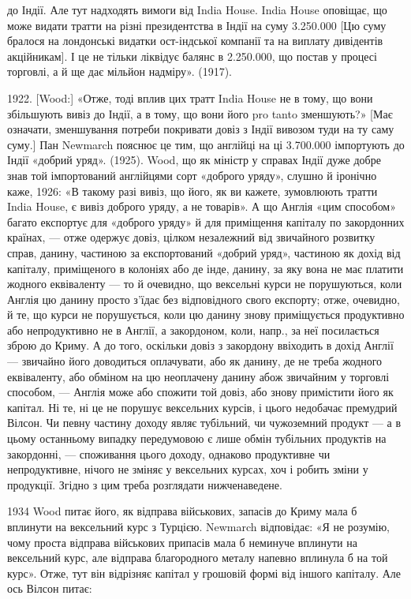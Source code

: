 \parcont{}  %
до Індії. Але тут надходять вимоги від India House. India House оповіщає, що
може видати тратти на різні президентства в Індії на суму \num{3.250.000}
[Цю суму бралося на лондонські видатки ост-індської компанії та на виплату
дивідентів акційникам]. І це не тільки ліквідує балянс в \num{2.250.000}, що
постав у процесі торговлі, а й ще дає мільйон надміру». (1917).

1922. [Wood:] «Отже, тоді вплив цих тратт India House не в тому, що
вони збільшують вивіз до Індії, а в тому, що вони його pro tanto зменшують?»
[Має означати, зменшування потреби покривати довіз з Індії вивозом туди на ту
саму суму.] Пан Newmarch пояснює це тим, що англійці на ці \num{3.700.000}
імпортують до Індії «добрий уряд». (1925). Wood, що як міністр у справах Індії дуже
добре знав той імпортований англійцями сорт «доброго уряду», слушно й іронічно
каже, 1926: «В такому разі вивіз, що його, як ви кажете, зумовлюють
тратти India House, є вивіз доброго уряду, а не товарів». А що Англія
«цим способом» багато експортує для «доброго уряду» й для приміщення
капіталу по закордонних країнах, — отже одержує довіз, цілком незалежний від
звичайного розвитку справ, данину, частиною за експортований «добрий уряд»,
частиною як дохід від капіталу, приміщеного в колоніях або де інде, данину,
за яку вона не має платити жодного еквіваленту — то й очевидно, що вексельні
курси не порушуються, коли Англія цю данину просто з’їдає без відповідного
свого експорту; отже, очевидно, й те, що курси не порушується, коли цю данину
знову приміщується продуктивно або непродуктивно не в Англії, а закордоном,
коли, напр., за неї посилається зброю до Криму. А до того, оскільки довіз з закордону
ввіходить в дохід Англії — звичайно його доводиться оплачувати, або як
данину, де не треба жодного еквіваленту, або обміном на цю неоплачену данину
абож звичайним у торговлі способом, — Англія може або спожити той довіз, або
знову примістити його як капітал. Ні те, ні це не порушує вексельних курсів,
і цього недобачає премудрий Вілсон. Чи певну частину доходу являє тубільний,
чи чужоземний продукт — а в цьому останньому випадку передумовою є
лише обмін тубільних продуктів на закордонні, — споживання цього доходу, однаково
продуктивне чи непродуктивне, нічого не зміняє у вексельних курсах,
хоч і робить зміни у продукції. Згідно з цим треба розглядати нижченаведене.

1934 Wood питає його, як відправа військових, запасів до Криму мала б
вплинути на вексельний курс з Турцією. Newmarch відповідає: «Я не розумію,
чому проста відправа військових припасів мала б неминуче вплинути на вексельний
курс, але відправа благородного металу напевно вплинула б на той
курс». Отже, тут він відрізняє капітал у грошовій формі від іншого капіталу.
Але ось Вілсон питає:

